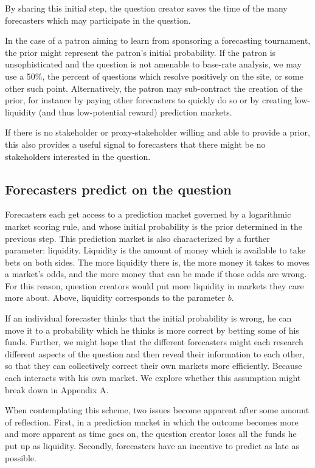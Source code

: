 \documentclass[]{article}
\begin{document}
By sharing this initial step, the question creator saves the time of the
many forecasters which may participate in the question.

In the case of a patron aiming to learn from sponsoring a forecasting
tournament, the prior might represent the patron's initial probability.
If the patron is unsophisticated and the question is not amenable to
base-rate analysis, we may use a 50\%, the percent of questions which
resolve positively on the site, or some other such point. Alternatively,
the patron may sub-contract the creation of the prior, for instance by
paying other forecasters to quickly do so or by creating low-liquidity
(and thus low-potential reward) prediction markets.

If there is no stakeholder or proxy-stakeholder willing and able to
provide a prior, this also provides a useful signal to forecasters that
there might be no stakeholders interested in the question.

\hypertarget{forecasters-predict-on-the-question}{%
\subsection{Forecasters predict on the
question}\label{forecasters-predict-on-the-question}}

Forecasters each get access to a prediction market governed by a
logarithmic market scoring rule, and whose initial probability is the
prior determined in the previous step. This prediction market is also
characterized by a further parameter: liquidity. Liquidity is the amount
of money which is available to take bets on both sides. The more
liquidity there is, the more money it takes to moves a market's odds,
and the more money that can be made if those odds are wrong. For this
reason, question creators would put more liquidity in markets they care
more about. Above, liquidity corresponds to the parameter \(b\).

If an individual forecaster thinks that the initial probability is
wrong, he can move it to a probability which he thinks is more correct
by betting some of his funds. Further, we might hope that the different
forecasters might each research different aspects of the question and
then reveal their information to each other, so that they can
collectively correct their own markets more efficiently. Because each
interacts with his own market. We explore whether this assumption might
break down in Appendix A.

When contemplating this scheme, two issues become apparent after some
amount of reflection. First, in a prediction market in which the outcome
becomes more and more apparent as time goes on, the question creator
loses all the funds he put up as liquidity. Secondly, forecasters have
an incentive to predict as late as possible.
\end{document}
